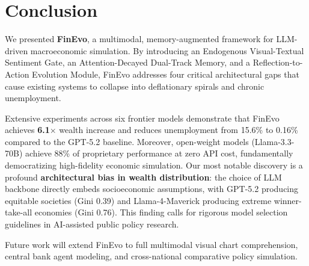 \section{Conclusion}

We presented \textbf{FinEvo}, a multimodal, memory-augmented framework for LLM-driven macroeconomic simulation. By introducing an Endogenous Visual-Textual Sentiment Gate, an Attention-Decayed Dual-Track Memory, and a Reflection-to-Action Evolution Module, FinEvo addresses four critical architectural gaps that cause existing systems to collapse into deflationary spirals and chronic unemployment.

Extensive experiments across six frontier models demonstrate that FinEvo achieves \textbf{6.1$\times$} wealth increase and reduces unemployment from 15.6\% to 0.16\% compared to the GPT-5.2 baseline. Moreover, open-weight models (Llama-3.3-70B) achieve 88\% of proprietary performance at zero API cost, fundamentally democratizing high-fidelity economic simulation. Our most notable discovery is a profound \textbf{architectural bias in wealth distribution}: the choice of LLM backbone directly embeds socioeconomic assumptions, with GPT-5.2 producing equitable societies (Gini 0.39) and Llama-4-Maverick producing extreme winner-take-all economies (Gini 0.76). This finding calls for rigorous model selection guidelines in AI-assisted public policy research.

Future work will extend FinEvo to full multimodal visual chart comprehension, central bank agent modeling, and cross-national comparative policy simulation.
